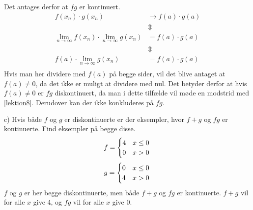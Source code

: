 \begin{bev} \textbf{} %
\newline
Det antages derfor at $fg$ er kontinuert.
\begin{align*}
    f(x_n) \cdot g(x_n) &\to f(a) \cdot g(a)\\
    &\Updownarrow\\
    \lim_{n\to \infty} f(x_n) \cdot \lim_{n \to \infty} g(x_n) &= f(a) \cdot g(a)\\
    &\Updownarrow\\
    f(a)\cdot\lim_{n \to \infty} g(x_n) &= f(a) \cdot g(a)\\
\end{align*}
Hvis man her dividere med $f(a)$ på begge sider, vil det blive antaget at $f(a) \neq 0$, da det ikke er muligt at dividere med nul. Det betyder derfor at hvis $f(a) \neq 0$ er $fg$ diskontinuert, da man i dette tilfælde vil møde en modstrid med \eqref{lektion8}. Derudover kan der ikke konkluderes på $fg$. 
\end{bev}

c) Hvis både $f$ og $g$ er diskontinuerte er der eksempler, hvor $f+g$ og $fg$ er kontinuerte. Find eksempler på begge disse.\\
$$f = \begin{cases} 
      4 & x\leq 0 \\
      0 & x>0 
   \end{cases}\\$$
$$g = \begin{cases} 
      0 & x\leq 0 \\
      4 & x>0 
   \end{cases}\\$$
$f$ og $g$ er her begge diskontinuerte, men både $f+g$ og $fg$ er kontinuerte. $f+g$ vil for alle $x$ give 4, og $fg$ vil for alle $x$ give 0.
